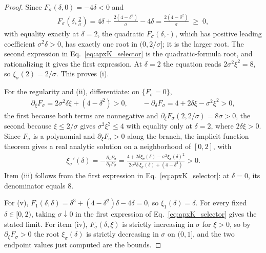 \documentclass{article}
\begin{document}
\begin{proof}
Since $F_\sigma(\delta,0)=-4\delta<0$ and
\begin{align}
    F_\sigma\!\left(\delta,\tfrac{2}{\sigma}\right)
    =
    4\delta+\frac{2(4-\delta^2)}{\sigma}-4\delta
    =
    \frac{2(4-\delta^2)}{\sigma}
    \;\ge\;0,
\end{align}
with equality exactly at $\delta=2$, the quadratic
$F_\sigma(\delta,\cdot)$, which has positive leading coefficient
$\sigma^2\delta>0$, has exactly one root in
$(0,2/\sigma]$; it is the larger root. The second expression in
Eq.~\eqref{eq:apxK_selector} is the quadratic-formula root, and rationalizing
it gives the first expression. At $\delta=2$ the equation reads
$2\sigma^2\xi^2=8$, so
$\xi_\sigma(2)=2/\sigma$. This proves (i).

For the regularity and (ii), differentiate: on $\{F_\sigma=0\}$,
\begin{align}
    \partial_\xi F_\sigma = 2\sigma^2\delta\xi+(4-\delta^2)>0,
    \qquad
    -\partial_\delta F_\sigma = 4+2\delta\xi-\sigma^2\xi^2>0,
\end{align}
the first because both terms are nonnegative and
$\partial_\xi F_\sigma(2,2/\sigma)=8\sigma>0$,
the second because $\xi\le 2/\sigma$ gives $\sigma^2\xi^2\le4$ with equality
only at $\delta=2$, where $2\delta\xi>0$. Since $F_\sigma$ is a polynomial and
$\partial_\xi F_\sigma>0$ along the branch, the implicit function theorem
gives
a real analytic solution on a neighborhood of $[0,2]$, with
\begin{align}
    \xi_\sigma'(\delta)
    =
    -\frac{\partial_\delta F_\sigma}{\partial_\xi F_\sigma}
    =
    \frac{4+2\delta\xi_\sigma(\delta)-\sigma^2\xi_\sigma(\delta)^2}
         {2\sigma^2\delta\,\xi_\sigma(\delta)+(4-\delta^2)}
    >0 .
    \label{eq:apxK_selector_derivative}
\end{align}
Item (iii) follows from the first expression in Eq.~\eqref{eq:apxK_selector}:
at $\delta=0$, its denominator equals $8$.

For (v), $F_1(\delta,\delta)=\delta^3+(4-\delta^2)\delta-4\delta=0$, so
$\xi_1(\delta)=\delta$. For every fixed $\delta\in[0,2)$, taking
$\sigma\downarrow0$ in the first expression of Eq.~\eqref{eq:apxK_selector}
gives the stated limit. For item (iv), $F_\sigma(\delta,\xi)$ is strictly
increasing in $\sigma$ for $\xi>0$, so by $\partial_\xi F_\sigma>0$ the root
$\xi_\sigma(\delta)$ is strictly decreasing in $\sigma$ on $(0,1]$, and the two
endpoint values just computed are the bounds.
\end{proof}
\end{document}
